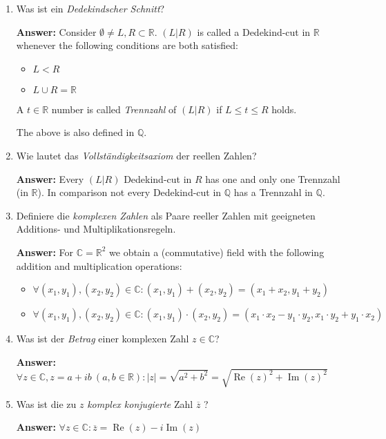\documentclass[11pt]{article}
\newcommand{\abs}[1]{\left|#1\right|}
\newcommand{\RR}[0]{\mathbb{R}}
\newcommand{\CC}[0]{\mathbb{C}}
\newcommand{\QQ}[0]{\mathbb{Q}}
\renewcommand{\Re}[0]{\operatorname{Re}}
\renewcommand{\Im}[0]{\operatorname{Im}}
\begin{document}
\begin{enumerate}
    \item Was ist ein \textit{Dedekindscher Schnitt}?

    \textbf{Answer:} Consider $\emptyset \neq L, R \subset \RR$. $(L|R)$ is called a Dedekind-cut in $\RR$ whenever the following conditions are both satisfied:
    \begin{itemize}
        \item $L < R$
        \item $L \cup R = \RR$
    \end{itemize}

    A $t\in\RR$ number is called \textit{Trennzahl} of $(L|R)$ if $L \le t \le R$ holds.

    The above is also defined in $\QQ$.

    \item Wie lautet das \textit{Vollständigkeitsaxiom} der reellen Zahlen?

    \textbf{Answer:} Every $(L|R)$ Dedekind-cut in $R$ has one and only one Trennzahl (in $\RR$). In comparison not every Dedekind-cut in $\QQ$ has a Trennzahl in $\QQ$.

    \item Definiere die \textit{komplexen Zahlen} als Paare reeller Zahlen mit geeigneten Additions- und Multiplikationsregeln.

    \textbf{Answer:} For $\CC = \RR^2$ we obtain a (commutative) field with the following addition and multiplication operations:
    \begin{itemize}
        \item $\forall (x_1, y_1), (x_2, y_2) \in \CC\colon (x_1, y_1) + (x_2, y_2) = (x_1 + x_2, y_1 + y_2)$
        \item $\forall (x_1, y_1), (x_2, y_2) \in \CC\colon (x_1, y_1) \cdot (x_2, y_2) = (x_1\cdot x_2 - y_1\cdot y_2, x_1 \cdot y_2 + y_1 \cdot x_2)$
    \end{itemize}

    \item Was ist der \textit{Betrag} einer komplexen Zahl $z \in \CC$?

    \textbf{Answer:} $\forall z \in \CC, z = a + ib~(a, b\in \RR)\colon \abs{z} = \sqrt{a^2 + b^2} = \sqrt{\Re(z)^2 + \Im(z)^2}$

    \item Was ist die zu $z$ \textit{komplex konjugierte} Zahl $\overline{z}$ ?

    \textbf{Answer:} $\forall z \in \CC\colon \overline{z} = \Re(z) - i\Im(z)$


\end{enumerate}
\end{document}
